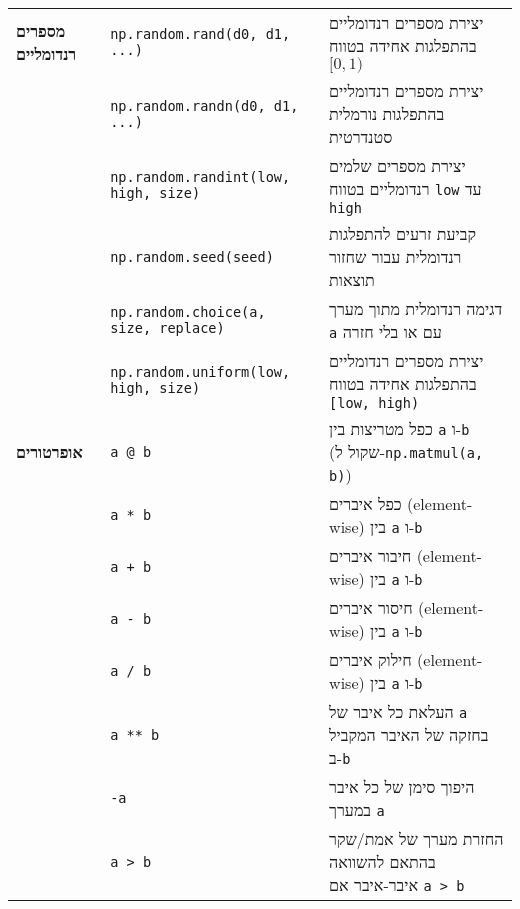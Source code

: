\documentclass[a4paper, 12pt]{article}
\begin{document}
\begin{longtable}{|p{}|p{}|p{}|}
\hline

\textbf{מספרים רנדומליים} & \textenglish{\texttt{np.random.rand(d0, d1, ...)}} & יצירת מספרים רנדומליים בהתפלגות אחידה בטווח \textenglish{$[0, 1)$} \\
                          & \textenglish{\texttt{np.random.randn(d0, d1, ...)}} & יצירת מספרים רנדומליים בהתפלגות נורמלית סטנדרטית \\
                          & \textenglish{\texttt{np.random.randint(low, high, size)}} & יצירת מספרים שלמים רנדומליים בטווח \textenglish{\texttt{low}} עד \textenglish{\texttt{high}} \\
                          & \textenglish{\texttt{np.random.seed(seed)}} & קביעת זרעים להתפלגות רנדומלית עבור שחזור תוצאות \\
                          & \textenglish{\texttt{np.random.choice(a, size, replace)}} & דגימה רנדומלית מתוך מערך \textenglish{\texttt{a}} עם או בלי חזרה \\
                          & \textenglish{\texttt{np.random.uniform(low, high, size)}} & יצירת מספרים רנדומליים בהתפלגות אחידה בטווח \textenglish{\texttt{[low, high)}} \\

\hline
\textbf{אופרטורים} & \textenglish{\texttt{a @ b}} & כפל מטריצות בין \textenglish{\texttt{a}} ו-\textenglish{\texttt{b}} (שקול ל-\textenglish{\texttt{np.matmul(a, b)}}) \\
                  & \textenglish{\texttt{a * b}} & כפל איברים (element-wise) בין \textenglish{\texttt{a}} ו-\textenglish{\texttt{b}} \\
                  & \textenglish{\texttt{a + b}} & חיבור איברים (element-wise) בין \textenglish{\texttt{a}} ו-\textenglish{\texttt{b}} \\
                  & \textenglish{\texttt{a - b}} & חיסור איברים (element-wise) בין \textenglish{\texttt{a}} ו-\textenglish{\texttt{b}} \\
                  & \textenglish{\texttt{a / b}} & חילוק איברים (element-wise) בין \textenglish{\texttt{a}} ו-\textenglish{\texttt{b}} \\
                  & \textenglish{\texttt{a ** b}} & העלאת כל איבר של \textenglish{\texttt{a}} בחזקה של האיבר המקביל ב-\textenglish{\texttt{b}} \\
                  & \textenglish{\texttt{-a}} & היפוך סימן של כל איבר במערך \textenglish{\texttt{a}} \\
                  & \textenglish{\texttt{a > b}} & החזרת מערך של אמת/שקר בהתאם להשוואה איבר-איבר אם \textenglish{\texttt{a > b}} \\



\end{longtable}
\end{document}
